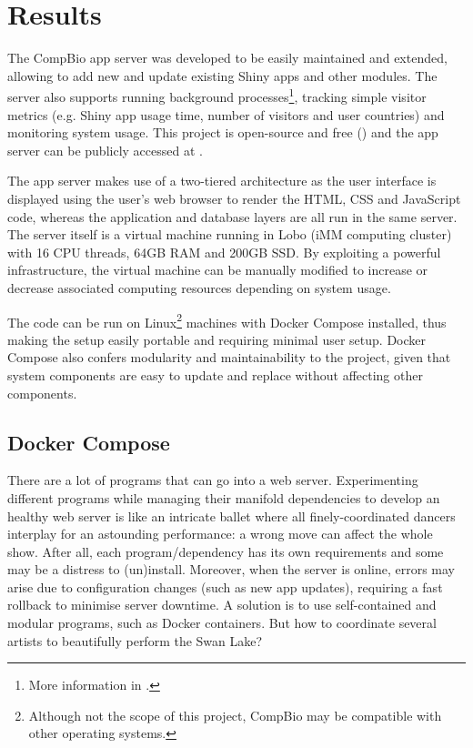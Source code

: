 \section{Results}

The CompBio app server was developed to be easily maintained and extended, allowing to add new and update existing Shiny apps and other modules. The server also supports running background processes\footnote{More information in .}, tracking simple visitor metrics (e.g. Shiny app usage time, number of visitors and user countries) and monitoring system usage. This project is open-source and free () and the app server can be publicly accessed at .

The app server makes use of a two-tiered architecture as the user interface is displayed using the user's web browser to render the HTML, CSS and JavaScript code, whereas the application and database layers are all run in the same server. The server itself is a virtual machine running in Lobo (iMM computing cluster) with 16 CPU threads, 64GB RAM and 200GB SSD. By exploiting a powerful infrastructure, the virtual machine can be manually modified to increase or decrease associated computing resources depending on system usage.

The code can be run on Linux\footnote{Although not the scope of this project, CompBio may be compatible with other operating systems.} machines with Docker Compose installed, thus making the setup easily portable and requiring minimal user setup. Docker Compose also confers modularity and maintainability to the project, given that system components are easy to update and replace without affecting other components.

\subsection{Docker Compose}

There are a lot of programs that can go into a web server. Experimenting different programs while managing their manifold dependencies to develop an healthy web server is like an intricate ballet where all finely-coordinated dancers interplay for an astounding performance: a wrong move can affect the whole show. After all, each program/dependency has its own requirements and some may be a distress to (un)install. Moreover, when the server is online, errors may arise due to configuration changes (such as new app updates), requiring a fast rollback to minimise server downtime. A solution is to use self-contained and modular programs, such as Docker containers. But how to coordinate several artists to beautifully perform the Swan Lake?

